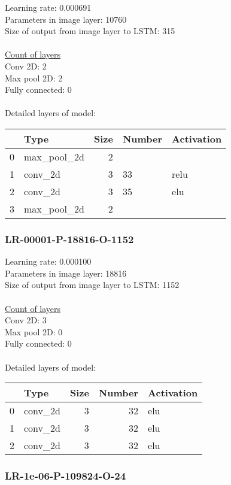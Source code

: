 Learning rate: 0.000691
\\Parameters in image layer: 10760
\\Size of output from image layer to LSTM: 315
\\\\\underline{Count of layers} 
\\Conv 2D:           2\\Max pool 2D:      2\\Fully connected:  0
\\\\Detailed layers of model: \\\begin{tabular}{rlrll}
\hline
    & Type        &   Size & Number   & Activation   \\
\hline
  0 & max\_pool\_2d &      2 &          &              \\
  1 & conv\_2d     &      3 & 33       & relu         \\
  2 & conv\_2d     &      3 & 35       & elu          \\
  3 & max\_pool\_2d &      2 &          &              \\
\hline
\end{tabular}\subsubsection*{LR-00001-P-18816-O-1152}
Learning rate: 0.000100
\\Parameters in image layer: 18816
\\Size of output from image layer to LSTM: 1152
\\\\\underline{Count of layers} 
\\Conv 2D:           3\\Max pool 2D:      0\\Fully connected:  0
\\\\Detailed layers of model: \\\begin{tabular}{rlrrl}
\hline
    & Type    &   Size &   Number & Activation   \\
\hline
  0 & conv\_2d &      3 &       32 & elu          \\
  1 & conv\_2d &      3 &       32 & elu          \\
  2 & conv\_2d &      3 &       32 & elu          \\
\hline
\end{tabular}\subsubsection*{LR-1e-06-P-109824-O-24}
